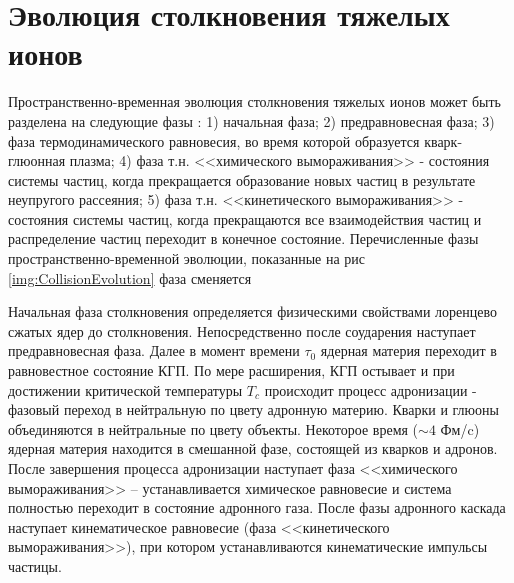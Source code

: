 \begin{comment}
	Переход из КГП в состояние адронного газа называют адронизацией кварк глюонной плазмы. Основными моделями адронизации КГП являются модель рекомбинации и модель фрагментации струн.
	
	\begin{figure}[] 
		\center
		\includegraphics [width = 0.7\linewidth] {Intro/PhaseDiagram.png}
		\caption{Теоретическая фазовая диаграмма ядерной материи для двух безмассовых кварков в зависимости от температуры T и барионного химического потенциала}
		\label{img:PhaseDiagram}  
	\end{figure}
	
	
	Температура перехода соответствует плотности энергии $\epsilon = 1$ ГэВ/фм$^3$, что почти на порядок превышает плотность ядерного вещества $\epsilon_0 = 0.15$ ГэВ/фм$^3$[1407.5003]. Температуры и давления, необходимые для образования кварк-глюонной материи, достигаются в столкновениях тяжелых релятивистских ионоов.
	
	Исследованию КГП в релятивистских столкновениях посвящены такие эксперименты, как PHENIX и STAR (BNL), ALICE(CERN), CBM(JSI), MPD(NICA) и другие.
\end{comment}

\section{Эволюция столкновения тяжелых ионов}

Пространственно-временная эволюция столкновения тяжелых ионов может быть разделена на следующие фазы \cite{QGP_signatures}: 1) начальная фаза; 2) предравновесная фаза; 3) фаза термодинамического равновесия, во время которой образуется кварк-глюонная плазма; 4) фаза т.н. <<химического вымораживания>> - состояния системы частиц, когда прекращается образование новых частиц в результате неупругого рассеяния; 5) фаза т.н. <<кинетического вымораживания>> - состояния системы частиц, когда прекращаются все взаимодействия частиц и распределение частиц переходит в конечное состояние.  
Перечисленные фазы пространственно-временной эволюции, показанные на рис  \ref{img:CollisionEvolution} фаза сменяется

Начальная фаза столкновения определяется физическими свойствами лоренцево сжатых ядер до столкновения. Непосредственно после соударения наступает предравновесная фаза. Далее в момент времени $\tau_0$ ядерная материя переходит в равновестное состояние КГП. По мере расширения, КГП остывает и при достижении критической температуры $T_c$ происходит процесс адронизации - фазовый переход в нейтральную по цвету адронную материю. Кварки и глюоны объединяются в нейтральные по цвету объекты. Некоторое время ($\sim 4$ Фм/c) ядерная материя находится в смешанной фазе, состоящей из кварков и адронов. После завершения процесса адронизации наступает фаза <<химического вымораживания>> -- устанавливается химическое равновесие и система полностью переходит в состояние адронного газа. После фазы адронного каскада наступает кинематическое равновесие (фаза <<кинетического вымораживания>>), при котором устанавливаются кинематические импульсы частицы.


